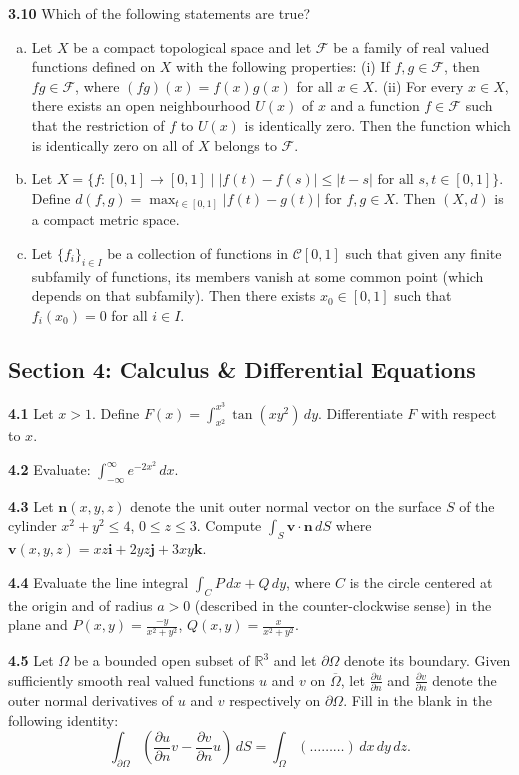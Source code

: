 \documentclass[11pt,a4paper]{article}
\newcommand{\R}{\mathbb{R}}
\newcommand{\examsec}[1]{%
  \subsection*{#1}
  \vspace{-2pt}
}
\newcommand{\qitem}[1]{\par\medskip\noindent\textbf{#1}\hspace{0.5em}}
\begin{document}
\qitem{3.10} Which of the following statements are true?
\begin{enumerate}[a.]
  \item Let $X$ be a compact topological space and let $\mathcal{F}$ be a family of real valued functions defined on $X$ with the following properties: (i) If $f, g \in \mathcal{F}$, then $fg \in \mathcal{F}$, where $(fg)(x) = f(x)g(x)$ for all $x \in X$. (ii) For every $x \in X$, there exists an open neighbourhood $U(x)$ of $x$ and a function $f \in \mathcal{F}$ such that the restriction of $f$ to $U(x)$ is identically zero. Then the function which is identically zero on all of $X$ belongs to $\mathcal{F}$.
  \item Let $X = \{f : [0, 1] \to [0, 1] \mid |f(t) - f(s)| \le |t - s| \text{ for all } s, t \in [0, 1]\}$. Define $d(f, g) = \max_{t \in [0, 1]} |f(t) - g(t)|$ for $f, g \in X$. Then $(X, d)$ is a compact metric space.
  \item Let $\{f_i\}_{i \in I}$ be a collection of functions in $\mathcal{C}[0, 1]$ such that given any finite subfamily of functions, its members vanish at some common point (which depends on that subfamily). Then there exists $x_0 \in [0, 1]$ such that $f_i(x_0) = 0$ for all $i \in I$.
\end{enumerate}

\examsec{Section 4: Calculus \& Differential Equations}

\qitem{4.1} Let $x > 1$. Define $F(x) = \displaystyle\int_{x^2}^{x^3} \tan(xy^2)\,dy$. Differentiate $F$ with respect to $x$.

\qitem{4.2} Evaluate: $\displaystyle\int_{-\infty}^{\infty} e^{-2x^2}\,dx$.

\qitem{4.3} Let $\mathbf{n}(x, y, z)$ denote the unit outer normal vector on the surface $S$ of the cylinder $x^2 + y^2 \le 4$, $0 \le z \le 3$. Compute $\int_S \mathbf{v}\cdot\mathbf{n}\,dS$ where $\mathbf{v}(x, y, z) = xz\mathbf{i} + 2yz\mathbf{j} + 3xy\mathbf{k}$.

\qitem{4.4} Evaluate the line integral $\int_C P\,dx + Q\,dy$, where $C$ is the circle centered at the origin and of radius $a > 0$ (described in the counter-clockwise sense) in the plane and $P(x, y) = \frac{-y}{x^2+y^2}$, $Q(x, y) = \frac{x}{x^2+y^2}$.

\qitem{4.5} Let $\Omega$ be a bounded open subset of $\R^3$ and let $\partial\Omega$ denote its boundary. Given sufficiently smooth real valued functions $u$ and $v$ on $\overline{\Omega}$, let $\frac{\partial u}{\partial n}$ and $\frac{\partial v}{\partial n}$ denote the outer normal derivatives of $u$ and $v$ respectively on $\partial\Omega$. Fill in the blank in the following identity:
\[
  \int_{\partial\Omega} \left(\frac{\partial u}{\partial n}v - \frac{\partial v}{\partial n}u\right)\,dS = \int_{\Omega} (\dots\dots\dots)\,dx\,dy\,dz.
\]
\end{document}
